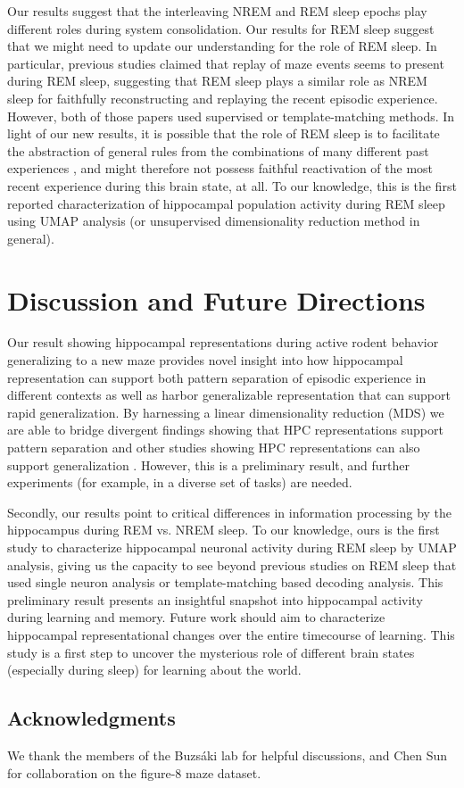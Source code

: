 Our results suggest that the interleaving NREM and REM sleep epochs play different roles during system consolidation. Our results for REM sleep suggest that we might need to update our understanding for the role of REM sleep. In particular, previous studies \citep{zielinski2021hippocampal, louie2001temporally} claimed that replay of maze events seems to present during REM sleep, suggesting that REM sleep plays a similar role as NREM sleep for faithfully reconstructing and replaying the recent episodic experience. However, both of those papers used supervised or template-matching methods. In light of our new results, it is possible that the role of REM sleep is to facilitate the abstraction of general rules from the combinations of many different past experiences \citep{lewis2018memory}, and might therefore not possess faithful reactivation of the most recent experience during this brain state, at all. To our knowledge, this is the first reported characterization of hippocampal population activity during REM sleep using UMAP analysis (or unsupervised dimensionality reduction method in general).

\section{Discussion and Future Directions}

Our result showing hippocampal representations during active rodent behavior generalizing to a new maze provides novel insight into how hippocampal representation can support both pattern separation of episodic experience in different contexts as well as harbor generalizable representation that can support rapid generalization. By harnessing a linear dimensionality reduction (MDS) we are able to bridge divergent findings showing that HPC representations support pattern separation \citep{yassa2011pattern, samborska2022complementary, tang2023geometric} and other studies showing HPC representations can also support generalization \citep{quiroga2005invariant, sun2020}. However, this is a preliminary result, and further experiments (for example, in a diverse set of tasks) are needed.

Secondly, our results point to critical differences in information processing by the hippocampus during REM vs. NREM sleep. To our knowledge, ours is the first study to characterize hippocampal neuronal activity during REM sleep by UMAP analysis, giving us the capacity to see beyond previous studies on REM sleep that used single neuron analysis or template-matching based decoding analysis. This preliminary result presents an insightful snapshot into hippocampal activity during learning and memory. Future work should aim to characterize hippocampal representational changes over the entire timecourse of learning. This study is a first step to uncover the mysterious role of different brain states (especially during sleep) for learning about the world.

\subsection*{Acknowledgments}

We thank the members of the Buzsáki lab for helpful discussions, and Chen Sun for collaboration on the figure-8 maze dataset.
